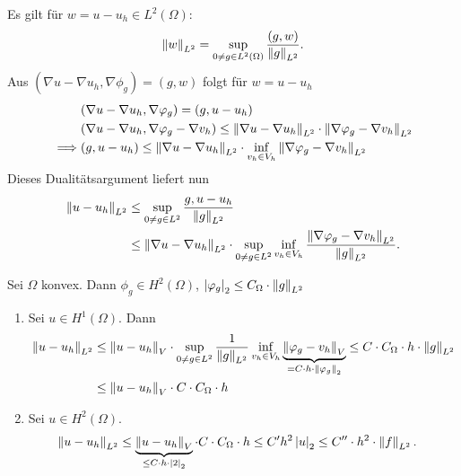 \begin{beweis}
  Es gilt für $w = u - u_{h} \in L^{2}(\Omega)$:
  \begin{align*}
    \left \|w \right\|_{L^{2}} = \sup_{0 \neq g \in L^{2}(\Omega)} \frac{(g, w)}{\left \|g \right\|_{L^{2}}}. 
  \end{align*}
Aus $(\nabla u - \nabla u_{h}, \nabla \phi_{g}) = (g, w)$ folgt für $w = u - u_{h}$
\begin{align*}
  &(\nabla u - \nabla u_{h}, \nabla \varphi_{g})= (g, u- u_{h})\\
  &(\nabla u - \nabla u_{h}, \nabla \varphi_{g} - \nabla v_{h}) \leq \left \|\nabla u - \nabla u_{h} \right\|_{L^{2}} \cdot \left \|\nabla \varphi_{g} - \nabla v_{h} \right\|_{L^{2}}\\
\implies & (g, u - u_{h}) \leq \left \|\nabla u - \nabla u_{h} \right\|_{L^{2}} \cdot \inf_{v_{h}\in V_{h}} \left \|\nabla \varphi_{g} - \nabla v_{h} \right\|_{L^{2}}
\end{align*}
Dieses Dualitätsargument liefert nun
\begin{align*}
  \left \|u - u_{h} \right\|_{L^{2}}&\leq \sup_{0 \neq g \in L^{2}} \frac{g, u - u_{h}}{ \left \|g \right\|_{L^{2}}}\\
&\leq \left \|\nabla u - \nabla u_{h} \right\|_{L^{2}} \cdot \sup_{0 \neq g \in L^{2}} \inf_{v_{h} \in V_{h}} \frac{\left \|\nabla \varphi_{g} - \nabla v_{h} \right\|_{L^{2}}}{\left \|g \right\|_{L^{2}}}. 
\end{align*}
\end{beweis}

\begin{folgerung}
  Sei $\Omega$ konvex. Dann $\phi_{g} \in H^{2}(\Omega)$, $\left|\varphi_{g}\right|_{2}\leq C_{\Omega} \cdot \left \|g \right\|_{L^{2}}$
  \begin{enumerate}
  \item Sei $u \in H^{1}(\Omega)$. Dann
    \begin{align*}
      \left \|u-u_{h} \right\|_{L^{2}} &\leq \left \|u-u_{h} \right\|_{V} \cdot \sup_{0 \neq g \in L^{2}} \frac {1}{\left \|g \right\|_{L^{2}}}\inf_{v_{h} \in V_{h}} \underbrace{\left \|\varphi_{g} - v_{h} \right\|_{V}}_{= C\cdot h\cdot \left \|\varphi_{g} \right\|_{2}} \leq C \cdot C_{\Omega}\cdot h\cdot \left \|g \right\|_{L^{2}}\\
&\leq \left \|u-u_{h} \right\|_{V}\cdot C \cdot C_{\Omega}\cdot h
    \end{align*}
\item Sei $u \in H^{2} (\Omega)$.
  \begin{align*}
      \left \|u-u_{h} \right\|_{L^{2}} &\leq \underbrace{\left \|u-u_{h} \right\|_{V}}_{\leq C\cdot h\cdot \left|2\right|_{2}}  \cdot C\cdot C_{\Omega} \cdot h \leq C' h^{2} \left|u\right| _{2} \leq C''\cdot h^{2}\cdot \left \|f \right\|_{L^{2}}. 
  \end{align*}
\end{enumerate}
\end{folgerung}

